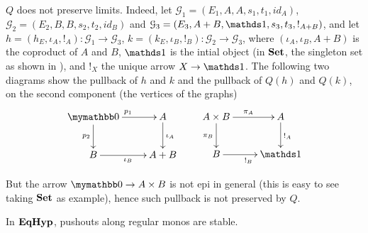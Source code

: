 \begin{example}
	$Q$ does not preserve limits. Indeed, let $\mathcal{G}_1 = (E_1, A, A, s_1, t_1, id_A)$, $\mathcal{G}_2 = (E_2, B, B, s_2, t_2, id_B)$ and $\mathcal{G}_3 = (E_3, A + B, \terminal, s_3, t_3, !_{A + B})$, and let $h = (h_E, \iota_A, !_A): \mathcal{G}_1 \to \mathcal{G}_3$, $k = (k_E, \iota_B, !_B): \mathcal{G}_2 \to \mathcal{G}_3$, where $(\iota_A, \iota_B, A + B)$ is the coproduct of $A$ and $B$, $\terminal$ is the intial object (in $\mathbf{Set}$, the singleton set as shown in ), and $!_X$ the unique arrow $X \to \terminal$.
	The following two diagrams show the pullback of $h$ and $k$ and the pullback of $Q(h)$ and $Q(k)$, on the second component (the vertices of the graphs)
	\[\xymatrix{
			\initial \ar[r]^{p_1} \ar[d]_{p_2}& A \ar[d]^{\iota_A} \\
			B \ar[r]_{\iota_B} & A+B
	}
	\qquad
	\xymatrix{
		{A \times B} \ar[r]^{\pi_A} \ar[d]_{\pi_B} & A \ar[d]^{!_A} \\
		B \ar[r]_{!_B} & \terminal
	}\]

	But the arrow $\initial \to A \times B$ is not epi in general (this is easy to see taking $\mathbf{Set}$ as example), hence such pullback is not preserved by $Q$.
\end{example}

\begin{lemma}\label{lemma:stab}
	In $\textbf{\textup{EqHyp}}$, pushouts along regular monos are stable.
\end{lemma}

